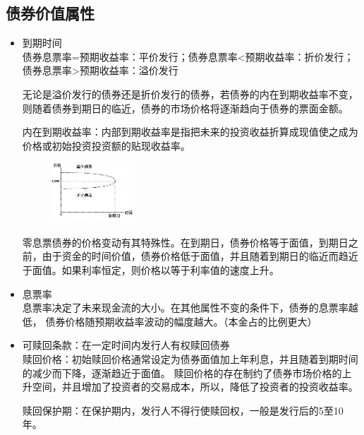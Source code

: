 \documentclass{article}
\begin{document}
\subsection*{债券价值属性}
\begin{itemize}
    \item 到期时间\\
    债券息票率=预期收益率：平价发行；债券息票率<预期收益率：折价发行；债券息票率>预期收益率：溢价发行

    无论是溢价发行的债券还是折价发行的债券，若债券的内在到期收益率不变，则随着债券到期日的临近，债券的市场价格将逐渐趋向于债券的票面金额。

    内在到期收益率：内部到期收益率是指把未来的投资收益折算成现值使之成为价格或初始投资投资额的贴现收益率。

    \begin{figure}[H]
        \begin{center}
            \includegraphics[width=0.3\textwidth]{1.png}

        \end{center}
    \end{figure}
    零息票债券的价格变动有其特殊性。在到期日，债券价格等于面值，到期日之前，由于资金的时间价值，债券价格低于面值，并且随着到期日的临近而趋近于面值。如果利率恒定，则价格以等于利率值的速度上升。
    \item 息票率\\
    息票率决定了未来现金流的大小。在其他属性不变的条件下，债券的息票率越低，
    债券价格随预期收益率波动的幅度越大。（本金占的比例更大）
    \item 可赎回条款：在一定时间内发行人有权赎回债券\\
    赎回价格：初始赎回价格通常设定为债券面值加上年利息，并且随着到期时间的减少而下降，逐渐趋近于面值。
    赎回价格的存在制约了债券市场价格的上升空间，并且增加了投资者的交易成本，所以，降低了投资者的投资收益率。

    赎回保护期：在保护期内，发行人不得行使赎回权，一般是发行后的5至10年。


\end{itemize}
\end{document}
